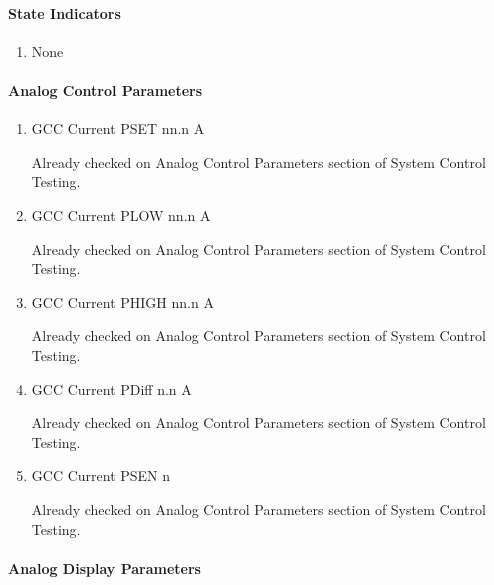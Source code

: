\documentclass[11pt]{book}		%
\begin{document}
\paragraph{State Indicators}

\begin{enumerate}
 \item None
\end{enumerate}

\paragraph{Analog Control Parameters}

\begin{enumerate}
 \item GCC Current PSET   nn.n A

\color{red}
Already checked on Analog Control Parameters section of System Control Testing.
\color{black}

 \item GCC Current PLOW   nn.n A

\color{red}
Already checked on Analog Control Parameters section of System Control Testing.
\color{black}

 \item GCC Current PHIGH  nn.n A

\color{red}
Already checked on Analog Control Parameters section of System Control Testing.
\color{black}

 \item GCC Current PDiff n.n A

\color{red}
Already checked on Analog Control Parameters section of System Control Testing.
\color{black}

 \item GCC Current PSEN  n

\color{red}
Already checked on Analog Control Parameters section of System Control Testing.
\color{black}

\end{enumerate}

\paragraph{Analog Display Parameters}
\end{document}
